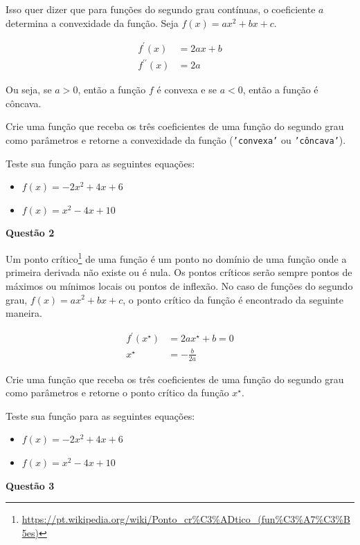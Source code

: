 \documentclass[12pt, a4paper]{article}
\begin{document}
Isso quer dizer que para funções do segundo grau contínuas, o coeficiente $a$ determina a convexidade da função. Seja $f(x) = ax^2 + bx + c$.

\begin{align*}
	f^{\prime} (x) &= 2ax + b \\
	f^{\prime \prime} (x) &= 2a
\end{align*}

Ou seja, se $a > 0$, então a função $f$ é convexa e se $a < 0$, então a função é côncava.

Crie uma função que receba os três coeficientes de uma função do segundo grau como parâmetros e retorne a convexidade da função (\texttt{'convexa'} ou \texttt{'côncava'}).

Teste sua função para as seguintes equações:

\begin{itemize}
	\item $f(x) = -2x^2 + 4x + 6$
	\item $f(x) = x^2 - 4x + 10$
\end{itemize}



\textbf{Questão 2}

Um ponto crítico\footnote{\url{https://pt.wikipedia.org/wiki/Ponto\_cr\%C3\%ADtico\_(fun\%C3\%A7\%C3\%B5es)}}
 de uma função é um ponto no domínio de uma função onde a primeira derivada não existe ou é nula. Os pontos críticos serão sempre pontos de máximos ou mínimos locais ou pontos de inflexão.
No caso de funções do segundo grau, $f(x) = ax^2 + bx + c$, o ponto crítico da função é encontrado da seguinte maneira.

\begin{align*}
	f^{\prime} (x^{\star}) &= 2ax^{\star} + b = 0\\
		x^{\star} &= -\frac{b}{2a}
\end{align*}

Crie uma função que receba os três coeficientes de uma função do segundo grau como parâmetros e retorne o ponto crítico da função $x^{\star}$.

Teste sua função para as seguintes equações:

\begin{itemize}
	\item $f(x) = -2x^2 + 4x + 6$
	\item $f(x) = x^2 - 4x + 10$
\end{itemize}



\textbf{Questão 3}
\end{document}
